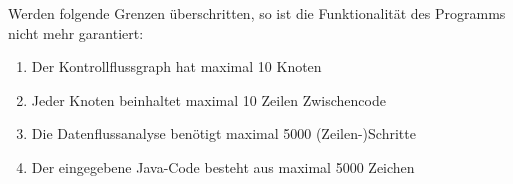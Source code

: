 Werden folgende Grenzen überschritten, so ist die Funktionalität des Programms nicht mehr garantiert:
\begin{enumerate}[label=(\alph*)]
\item Der Kontrollflussgraph hat maximal 10 Knoten
\item Jeder Knoten beinhaltet maximal 10 Zeilen Zwischencode
\item Die Datenflussanalyse benötigt maximal 5000 (Zeilen-)Schritte
\item Der eingegebene Java-Code besteht aus maximal 5000 Zeichen
\end{enumerate}